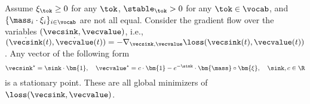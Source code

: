 \begin{theorem}\label{appthm:main-1} 
Assume $\xi_\tok \ge 0$ for any $\tok$, $\stable_\tok > 0$ for any $\tok\in\vocab$, and $\{ \mass_i \cdot \xi_i \}_{i \in \vocab}$ are not all equal. Consider the gradient flow over the variables $(\vecsink, \vecvalue)$, i.e., $(\dot{\vecsink}(t), \dot{\vecvalue}(t)) = - \nabla_{\vecsink, \vecvalue}\loss(\vecsink(t), \vecvalue(t))$. Any vector of the following form
    \begin{equation}\vecsink^\star = \sink \cdot \bm{1}, \quad \vecvalue^\star = c \cdot \bm{1} - e^{-\sink} \cdot \bm{\mass} \circ \bm{\xi},  ~~~ \sink, c\in\R \end{equation}
 is a stationary point. These are all global minimizers of $\loss(\vecsink,\vecvalue)$.
\end{theorem}

